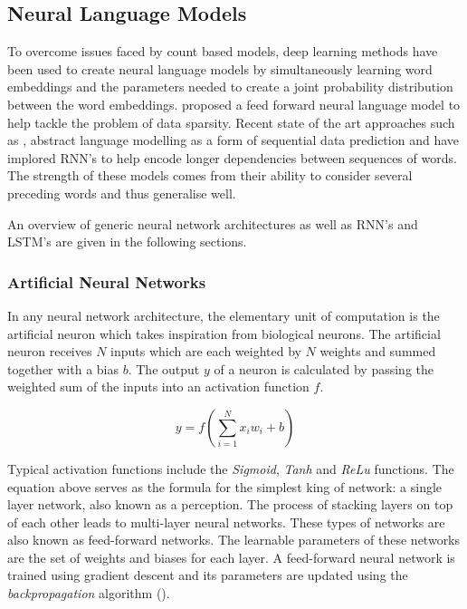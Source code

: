\subsection{Neural Language Models}
To overcome issues faced by count based models, deep learning methods have been used to create neural language models by simultaneously learning word embeddings and the parameters needed to create a joint probability distribution between the word embeddings. \cite{Bengio2003} proposed a feed forward neural language model to help tackle the problem of data sparsity. Recent state of the art approaches such as \cite{Mikolov2010}, abstract language modelling as a form of sequential data prediction and have implored RNN's to help encode longer dependencies between sequences of words. The strength of these models comes from their ability to consider several preceding words and thus generalise well.

\noindent
\newline
An overview of generic neural network architectures as well as RNN's and LSTM's are given in the following sections.

\noindent
\newline
\newline
\subsubsection{Artificial Neural Networks}
In any neural network architecture, the elementary unit of computation is the artificial neuron which takes inspiration from biological neurons. The artificial neuron receives \(N\) inputs which are each weighted by \(N\) weights and summed together with a bias \(b\). The output \(y\) of a neuron is calculated by passing the weighted sum of the inputs into an activation function \(f\). 

\begin{equation}
	y = f\left( \sum_{i=1}^{N} x_{i}w_{i} + b\right)
\end{equation}

\noindent
\newline
Typical activation functions include the \textit{Sigmoid}, \textit{Tanh} and \textit{ReLu} functions. The equation above serves as the formula for the simplest king of network: a single layer network, also known as a perception. The process of stacking layers on top of each other leads to multi-layer neural networks. These types of networks are also known as feed-forward networks. The learnable parameters of these networks are the set of weights and biases for each layer. A feed-forward neural network is trained using gradient descent and its parameters are updated using the \textit{backpropagation} algorithm (\cite{Rumelhart1988}).

